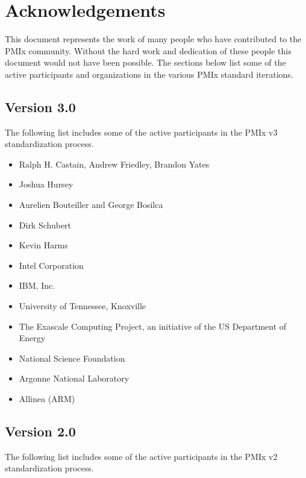 \chapter{Acknowledgements}
\label{chap:acknowledgements}

This document represents the work of many people who have contributed to the PMIx community.
Without the hard work and dedication of these people this document would not have been possible.
The sections below list some of the active participants and organizations in the various PMIx standard iterations.

\section{Version 3.0}

The following list includes some of the active participants in the PMIx v3 standardization process.

\begin{itemize}
\item Ralph H. Castain, Andrew Friedley, Brandon Yates
\item Joshua Hursey
\item Aurelien Bouteiller and George Bosilca
\item Dirk Schubert
\item Kevin Harms
\end{itemize}

\begin{itemize}
\item Intel Corporation
\item IBM, Inc.
\item University of Tennessee, Knoxville
\item The Exascale Computing Project, an initiative of the US Department of Energy
\item National Science Foundation
\item Argonne National Laboratory
\item Allinea (ARM)
\end{itemize}

\section{Version 2.0}

The following list includes some of the active participants in the PMIx v2 standardization process.


